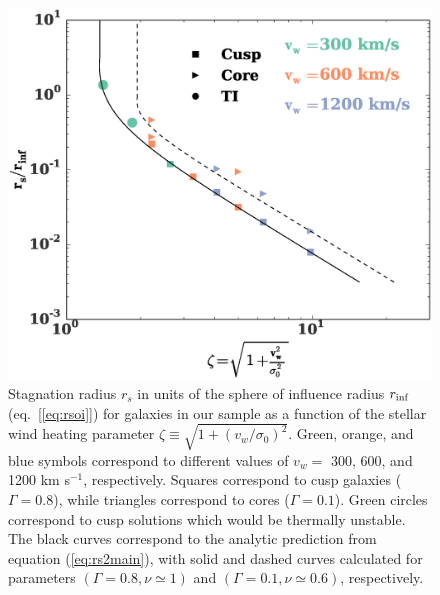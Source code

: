\documentclass[usenatbib,fleqn]{mn2e}
\newcommand{\densSlope}{\nu}
\begin{document}
\begin{figure}
  \includegraphics[width=\columnwidth]{rs.eps}
  \caption{\label{fig:stag} Stagnation radius $r_{s}$ in units of the
    sphere of influence radius $r_{\rm inf}$ (eq.~[\ref{eq:rsoi}]) for
    galaxies in our sample as a function of the stellar wind heating
    parameter $\zeta \equiv \sqrt{1+(v_w/\sigma_0)^{2}}$.
    Green, orange, and blue symbols correspond to different values of
    $v_{w} =$ 300, 600, and 1200 km s$^{-1}$, respectively.  Squares
    correspond to cusp galaxies ($\Gamma = 0.8$), while triangles
    correspond to cores ($\Gamma = 0.1$). Green circles correspond to
    cusp solutions which would be thermally unstable. The black curves
    correspond to the analytic prediction from equation
    (\ref{eq:rs2main}), with solid and dashed curves calculated for
    parameters $(\Gamma=0.8, \densSlope\simeq1)$ and
    $(\Gamma=0.1,\densSlope\simeq0.6)$, respectively. }
\end{figure}
\end{document}
